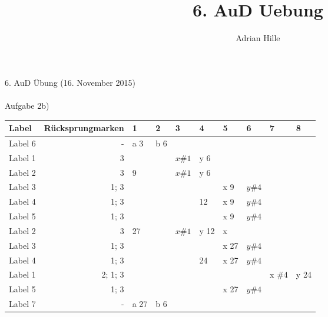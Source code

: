 \documentclass{scrartcl}
\title{6. AuD Uebung}
\author{Adrian Hille}
\begin{document}
\Large 6. AuD \"Ubung (16. November 2015)\\
\\
\normalsize
Aufgabe 2b) \\
\begin{table}[H]
\begin{tabular}{l|r|l|l|l|l|l|l|l|l}
	Label & R\"ucksprungmarken & 1 & 2 & 3 & 4 & 5 & 6 & 7 & 8\\
	\hline
	Label 6 & - & a 3 & b 6 & & & & & & \\
	\hline
	Label 1 & 3 &  &  & $x \#1$ & y 6 & & & & \\
	\hline
	Label 2 & 3 & 9 &  & $x \#1$ & y 6 & & & & \\
	\hline
	Label 3 & 1; 3 &  &  &  & & x 9 & $y \# 4$& & \\
	\hline
	Label 4 & 1; 3 &  &  &  & 12 & x 9 & $y \# 4$& & \\
	\hline
	Label 5 & 1; 3 &  &  &  & & x 9 & $y \# 4$& & \\
	\hline
	Label 2 &  3 & 27 &  &$x \# 1$&y 12& x  & & & \\
	\hline
	Label 3 & 1; 3 &  &  & & & x 27  &$y \# 4$ & & \\
	\hline
	Label 4 & 1; 3 &  &  & & 24 & x 27  &$y \# 4$ & & \\
	\hline
	Label 1 & 2; 1; 3 &  &  & & &  & &x $\# 4$ &y 24 \\
	\hline
	Label 5 & 1; 3 &  &  & &  & x 27  &$y \# 4$ & & \\
	\hline
	Label 7 & - &  a 27 & b 6 & &  & & & & \\
\end{tabular}
\end{table}
\end{document}
